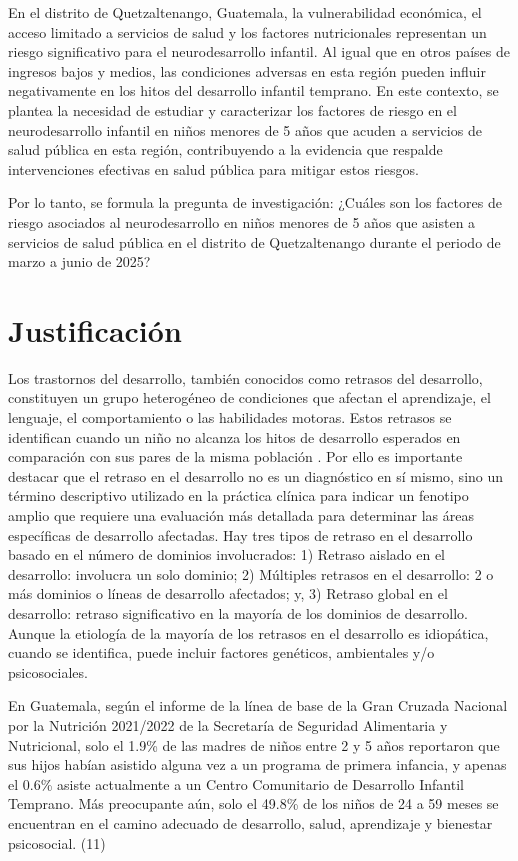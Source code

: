 \documentclass[11pt,letterpaper]{report}
\newcommand{\tiempito}{marzo a junio de 2025}
\begin{document}
En el distrito de Quetzaltenango, Guatemala, la vulnerabilidad económica, el
acceso limitado a servicios de salud y los factores nutricionales representan
un riesgo significativo para el neurodesarrollo infantil. Al igual que en otros
países de ingresos bajos y medios, las condiciones adversas en esta región
pueden influir negativamente en los hitos del desarrollo infantil temprano. En
este contexto, se plantea la necesidad de estudiar y caracterizar los factores
de riesgo en el neurodesarrollo infantil en niños menores de 5 años que acuden
a servicios de salud pública en esta región, contribuyendo a la evidencia que
respalde intervenciones efectivas en salud pública para mitigar estos riesgos.

Por lo tanto, se formula la pregunta de investigación: ¿Cuáles son los factores
de riesgo asociados al neurodesarrollo en niños menores de 5 años que asisten a
servicios de salud pública en el distrito de Quetzaltenango durante el periodo
de \tiempito?

	\chapter*{Justificación}
Los trastornos del desarrollo, también conocidos como retrasos del desarrollo,
constituyen un grupo heterogéneo de condiciones que afectan el aprendizaje, el
lenguaje, el comportamiento o las habilidades motoras.
\cite{cdcDevelopmentalDisability} Estos retrasos se identifican cuando un niño
no alcanza los hitos de desarrollo esperados en comparación con sus pares de la
misma población \cite{DevelopmentalSurveillance}. Por ello es importante
destacar que el retraso en el desarrollo no es un diagnóstico en sí mismo, sino
un término descriptivo utilizado en la práctica clínica para indicar un
fenotipo amplio que requiere una evaluación más detallada para determinar las
áreas específicas de desarrollo afectadas. Hay tres tipos de retraso en el
desarrollo basado en el número de dominios involucrados: 1) Retraso aislado en
el desarrollo: involucra un solo dominio; 2) Múltiples retrasos en el
desarrollo: 2 o más dominios o líneas de desarrollo afectados; y, 3) Retraso
global en el desarrollo: retraso significativo en la mayoría de los dominios de
desarrollo. \cite{Bellman2013} Aunque la etiología de la mayoría de los
retrasos en el desarrollo es idiopática, cuando se identifica, puede incluir
factores genéticos, ambientales y/o psicosociales. \cite{DevelopmentalDelay}

En Guatemala, según el informe de la línea de base de la Gran Cruzada Nacional
por la Nutrición 2021/2022 de la Secretaría de Seguridad Alimentaria y
Nutricional, solo el 1.9\% de las madres de niños entre 2 y 5 años reportaron
que sus hijos habían asistido alguna vez a un programa de primera infancia, y
apenas el 0.6\% asiste actualmente a un Centro Comunitario de Desarrollo
Infantil Temprano. Más preocupante aún, solo el 49.8\% de los niños de 24 a 59
meses se encuentran en el camino adecuado de desarrollo, salud, aprendizaje y
bienestar psicosocial. (11)
\end{document}

